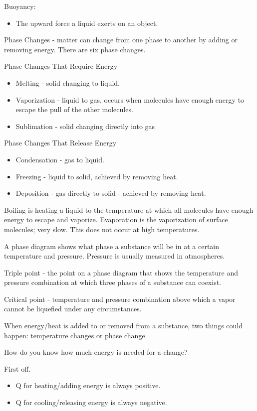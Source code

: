 \documentclass[../hchem.tex]{subfiles}
\begin{document}
Buoyancy:
\begin{itemize}
    \item The upward force a liquid exerts on an object.
\end{itemize}

Phase Changes - matter can change from one phase to another by adding or removing energy. There are six phase changes.

Phase Changes That Require Energy
\begin{itemize}
    \item Melting - solid changing to liquid.
    \item Vaporization - liquid to gas, occurs when molecules have enough energy to escape the pull of the other molecules.
    \item Sublimation - solid changing directly into gas 
\end{itemize}

Phase Changes That Release Energy 
\begin{itemize}
    \item Condensation - gas to liquid.
    \item Freezing - liquid to solid, achieved by removing heat.
    \item Deposition - gas directly to solid - achieved by removing heat.
\end{itemize}

Boiling is heating a liquid to the temperature at which all molecules have enough energy to escape and vaporize. Evaporation is the vaporization of surface molecules; very slow. This does not occur at high temperatures.

A phase diagram shows what phase a substance will be in at a certain temperature and pressure. Pressure is usually measured in atmospheres.

Triple point - the point on a phase diagram that shows the temperature and pressure combination at which three phases of a substance can coexist.

Critical point - temperature and pressure combination above which a vapor cannot be liquefied under any circumstances.

When energy/heat is added to or removed from a substance, two things could happen: temperature changes or phase change.

How do you know how much energy is needed for a change?

First off.
\begin{itemize}
    \item Q for heating/adding energy is always positive.
    \item Q for cooling/releasing energy is always negative.
\end{itemize}
\end{document}
